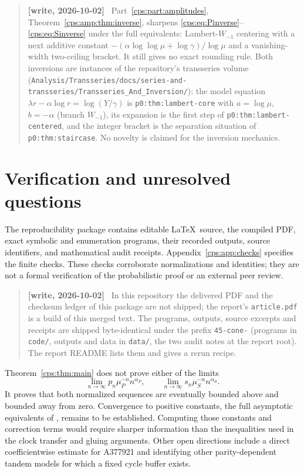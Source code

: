 \documentclass[11pt,letterpaper]{article}
\numberwithin{equation}{section}
\theoremstyle{remark}\newtheorem{remark}[theorem]{Remark}
\newcommand{\repo}[1]{\nolinkurl{#1}}
\newenvironment{writenote}{\begin{quote}\small\sloppy\textbf{[write, 2026-10-02]}\ }{\end{quote}}
\begin{document}
\begin{writenote}
Part~\ref{cps:part:amplitudes}, Theorem~\ref{cps:amp:thm:inverse}, sharpens
\eqref{cps:eq:Pinverse}--\eqref{cps:eq:Sinverse} under the full equivalents: Lambert-$W_{-1}$
centering with a next additive constant $-(\alpha\log\log\mu+\log\gamma)/\log\mu$ and a
vanishing-width two-ceiling bracket. It still gives no exact rounding rule. Both inversions are
instances of the repository's transseries volume
(\repo{Analysis/Transseries/docs/series-and-transseries/Transseries_And_Inversion/}): the
model equation $\lambda r-\alpha\log r=\log(Y/\gamma)$ is \texttt{p0:thm:lambert-core} with
$a=\log\mu$, $b=-\alpha$ (branch $W_{-1}$), its expansion is the first step of
\texttt{p0:thm:lambert-centered}, and the integer bracket is the separation situation of
\texttt{p0:thm:staircase}. No novelty is claimed for the inversion mechanics.
\end{writenote}

\section{Verification and unresolved questions}\label{cps:sec:verification}
The reproducibility package contains editable \LaTeX\ source, the compiled PDF, exact symbolic and enumeration programs, their recorded outputs, source identifiers, and mathematical audit receipts. Appendix~\ref{cps:app:checks} specifies the finite checks. These checks corroborate normalizations and identities; they are not a formal verification of the probabilistic proof or an external peer review.

\begin{writenote}
In this repository the delivered PDF and the checksum ledger of this package are not
shipped; the report's \texttt{article.pdf} is a build of this merged text. The programs,
outputs, source excerpts and receipts are shipped byte-identical under the prefix
\texttt{45-cone-} (programs in \texttt{code/}, outputs and data in \texttt{data/}, the two audit
notes at the report root). The report README lists them and gives a rerun recipe.
\end{writenote}

Theorem~\ref{cps:thm:main} does not prove either of the limits
\begin{equation}\label{cps:eq:amplitudes}
 \lim_{n\to\infty}p_n\mu_P^{-n}n^{\alpha_P},\qquad
 \lim_{n\to\infty}s_n\mu_S^{-n}n^{\alpha_S}.
\end{equation}
It proves that both normalized sequences are eventually bounded above and bounded away from zero. Convergence to positive constants, the full asymptotic equivalents of \cite[Conjecture 25]{FNS}, remains to be established. Computing those constants and correction terms would require sharper information than the inequalities used in the clock transfer and gluing arguments. Other open directions include a direct coefficientwise estimate for A377921 and identifying other parity-dependent tandem models for which a fixed cycle buffer exists.
\end{document}
